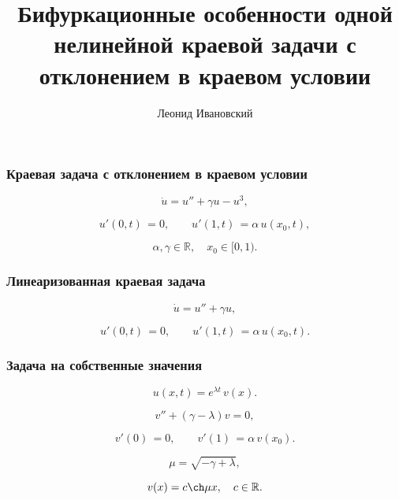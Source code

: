 \documentclass[fullscreen=true, unicode, bookmarks=false]{beamer}
\title[]{ {\huge Бифуркационные особенности одной нелинейной краевой задачи с отклонением в краевом условии} }
\author[]{{\Large Леонид Ивановский}}
\date{ }
\institute[]
{ аспирант 4 курса, ЯрГУ им. П.Г. Демидова }
\begin{document}
\begin{frame}
\titlepage
\end{frame} 

\begin{frame}
\frametitle{ Краевая задача с отклонением в краевом условии }
 
\begin{equation}
	\dot u = u'' + \gamma u - u^3,	
\end{equation}

\begin{equation}
	u'(0, t) \, = 0, \qquad u'(1, t) \, = \alpha\,u(x_0, t),
\end{equation}

\bigskip
\pause

$$ \alpha, \gamma \in \mathbb{R}, \quad x_0 \in [0, 1). $$

\end{frame}

\begin{frame}
\frametitle{ Линеаризованная краевая задача }
 
\begin{equation}
	\dot u = u'' + \gamma u,	
\end{equation}

\begin{equation}	
	u'(0, t) \, = 0, \qquad u'(1, t) \, = \alpha\,u(x_0, t).
\end{equation}

\end{frame}

\begin{frame}
\frametitle{ Задача на собственные значения }
 
$$ u(x, t) = e^{\lambda t} \, v(x). $$

\bigskip
\pause
 
\begin{equation}
	v'' + (\gamma - \lambda)v = 0,	
\end{equation}

\begin{equation}	
	v'(0) \, = 0, \qquad v'(1) \, = \alpha\,v(x_0).
\end{equation}

\bigskip
\pause

$$ \mu = \sqrt{-\gamma + \lambda}, $$

$$ v(x) = c \ch  \mu x, \quad c \in \mathbb{R}. $$

\end{frame}
\end{document}

